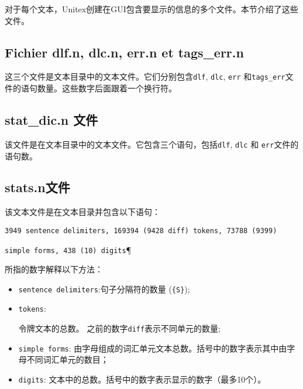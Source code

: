 对于每个文本，Unitex创建在GUI包含要显示的信息的多个文件。本节介绍了这些文件。

\subsection{Fichier dlf.n, dlc.n, err.n et tags\_err.n}
这三个文件是文本目录中的文本文件。它们分别包含\verb+dlf+, \verb+dlc+, \verb+err+ 和\verb+tags_err+文件的语句数量。这些数字后面跟着一个换行符。

\subsection{ stat\_dic.n 文件}
该文件是在文本目录中的文本文件。它包含三个语句，包括\verb+dlf+, \verb+dlc+ 和 \verb+err+文件的语句数。

\subsection{ stats.n文件}
该文本文件是在文本目录并包含以下语句：


\bigskip
\verb$3949 sentence delimiters, 169394 (9428 diff) tokens, 73788 (9399)$

\verb$simple forms, 438 (10) digits$\P

\bigskip
\noindent
所指的数字解释以下方法：


\begin{itemize}
  \item \verb+sentence delimiters+:句子分隔符的数量
  (\verb+{S}+);

  \item \verb+tokens+: 
  
  
  令牌文本的总数。 之前的数字\verb+diff+表示不同单元的数量;  

  \item \verb+simple forms+: 
  由字母组成的词汇单元文本总数。括号中的数字表示其中由字母不同词汇单元的数目；
  
  \item \verb+digits+: 
文本中的总数。括号中的数字表示显示的数字（最多10个）。

\end{itemize}


